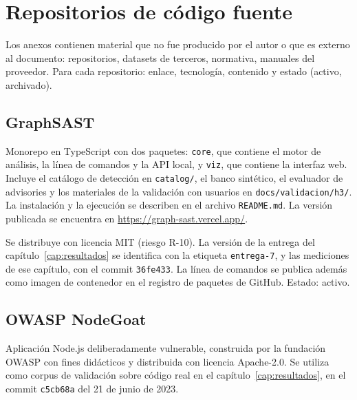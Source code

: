 
\chapter{Repositorios de código fuente}\label{anx:repositorios}

\begin{guia}
Los anexos contienen material que no fue producido por el autor o que
es externo al documento: repositorios, datasets de terceros, normativa,
manuales del proveedor. Para cada repositorio: enlace, tecnología,
contenido y estado (activo, archivado).
\end{guia}

\section{GraphSAST}


Monorepo en TypeScript con dos paquetes: \texttt{core}, que contiene el
motor de análisis, la línea de comandos y la API local, y \texttt{viz},
que contiene la interfaz web. Incluye el catálogo de detección en
\texttt{catalog/}, el banco sintético, el evaluador de advisories y los
materiales de la validación con usuarios en
\texttt{docs/validacion/h3/}. La instalación y la ejecución se describen
en el archivo \texttt{README.md}. La versión publicada se encuentra en
\url{https://graph-sast.vercel.app/}.

Se distribuye con licencia MIT (riesgo R-10). La versión de la entrega
del capítulo~\ref{cap:resultados} se identifica con la etiqueta
\texttt{entrega-7}, y las mediciones de ese capítulo, con el commit
\texttt{36fe433}. La línea de comandos se publica además como imagen de
contenedor en el registro de paquetes de GitHub. Estado: activo.

\section{OWASP NodeGoat}


Aplicación Node.js deliberadamente vulnerable, construida por la
fundación OWASP con fines didácticos y distribuida con licencia
Apache-2.0. Se utiliza como corpus de validación sobre código real en el
capítulo~\ref{cap:resultados}, en el commit
\texttt{c5cb68a} del 21 de junio de 2023.
